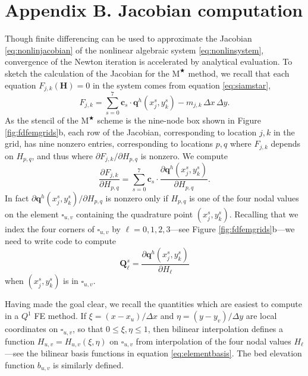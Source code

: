 \documentclass[twocolumn,letterpaper]{igs}
\newcommand\bc{\mathbf{c}}
\newcommand\bq{\mathbf{q}}
\newcommand\bH{\mathbf{H}}
\newcommand\bQ{\mathbf{Q}}
\newcommand{\Mstar}{$\text{M}^{\bigstar}$\xspace}
\begin{document}
\section{Appendix B. Jacobian computation}  \label{sec:appB}

Though finite differencing can be used to approximate the Jacobian \eqref{eq:nonlinjacobian} of the nonlinear algebraic system \eqref{eq:nonlinsystem}, convergence of the Newton iteration is accelerated by analytical evaluation.  To sketch the calculation of the Jacobian for the \Mstar method, we recall that each equation $F_{j,k}(\bH)=0$ in the system comes from equation \eqref{eq:siamstar},
\begin{equation}
  F_{j,k} = \sum_{s=0}^7 \bc_s\cdot \bq^h(x_j^s,y_k^s) - m_{j,k}\,\Delta x\,\Delta y.  \label{eq:res}
\end{equation}
As the stencil of the \Mstar scheme is the nine-node box shown in Figure \ref{fig:fdfemgrids}b, each row of the Jacobian, corresponding to location $j,k$ in the grid, has nine nonzero entries, corresponding to locations $p,q$ where $F_{j,k}$ depends on $H_{p,q}$, and thus where $\partial F_{j,k}/\partial H_{p,q}$ is nonzero.  We compute
\begin{equation}
\frac{\partial F_{j,k}}{\partial H_{p,q}} = \sum_{s=0}^7 \bc_s\cdot \frac{\partial \bq^h(x_j^s,y_k^s)}{\partial H_{p,q}}. \label{eq:jacQsum}
\end{equation}
In fact $\partial \bq^h(x_j^s,y_k^s)/\partial H_{p,q}$ is nonzero only if $H_{p,q}$ is one of the four nodal values on the element $\square_{u,v}$ containing the quadrature point $(x_j^s,y_k^s)$.  Recalling that we index the four corners of $\square_{u,v}$ by $\ell=0,1,2,3$---see Figure \ref{fig:fdfemgrids}b---we need to write code to compute
\begin{equation}
\bQ_\ell^s = \frac{\partial \bq^h(x_j^s,y_k^s)}{\partial H_\ell} \label{eq:jacthegoal}
\end{equation}
when $(x_j^s,y_k^s)$ is in $\square_{u,v}$.

Having made the goal clear, we recall the quantities which are easiest to compute in a $Q^1$ FE method.  If $\xi=(x-x_u)/\Delta x$ and $\eta=(y-y_v)/\Delta y$ are local coordinates on $\square_{u,v}$, so that $0\le \xi,\eta \le 1$, then bilinear interpolation defines a function $H_{u,v}=H_{u,v}(\xi,\eta)$ on $\square_{u,v}$ from interpolation of the four nodal values $H_\ell$---see the bilinear basis functions in equation \eqref{eq:elementbasis}.  The bed elevation function $b_{u,v}$ is similarly defined.
\end{document}
